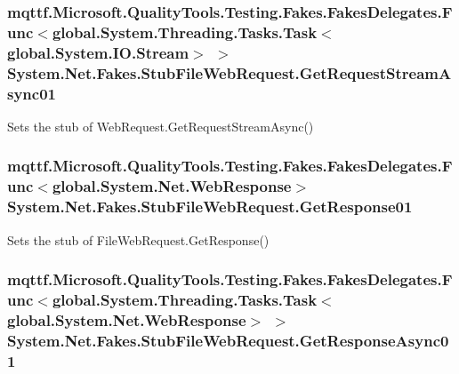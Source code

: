 \hypertarget{class_system_1_1_net_1_1_fakes_1_1_stub_file_web_request_a35c7c5cdf1c0ea35197c3db3ef3066fd}{
\subsubsection[{Get\-Request\-Stream\-Async01}]{\setlength{\rightskip}{0pt plus 5cm}mqttf.\-Microsoft.\-Quality\-Tools.\-Testing.\-Fakes.\-Fakes\-Delegates.\-Func$<$global.\-System.\-Threading.\-Tasks.\-Task$<$global.\-System.\-I\-O.\-Stream$>$ $>$ System.\-Net.\-Fakes.\-Stub\-File\-Web\-Request.\-Get\-Request\-Stream\-Async01}}\label{class_system_1_1_net_1_1_fakes_1_1_stub_file_web_request_a35c7c5cdf1c0ea35197c3db3ef3066fd}


Sets the stub of Web\-Request.\-Get\-Request\-Stream\-Async()

\hypertarget{class_system_1_1_net_1_1_fakes_1_1_stub_file_web_request_a988e69b85c2369d6111cde447ac1ab4d}{
\subsubsection[{Get\-Response01}]{\setlength{\rightskip}{0pt plus 5cm}mqttf.\-Microsoft.\-Quality\-Tools.\-Testing.\-Fakes.\-Fakes\-Delegates.\-Func$<$global.\-System.\-Net.\-Web\-Response$>$ System.\-Net.\-Fakes.\-Stub\-File\-Web\-Request.\-Get\-Response01}}\label{class_system_1_1_net_1_1_fakes_1_1_stub_file_web_request_a988e69b85c2369d6111cde447ac1ab4d}


Sets the stub of File\-Web\-Request.\-Get\-Response()

\hypertarget{class_system_1_1_net_1_1_fakes_1_1_stub_file_web_request_a603ae8c31125fc3831b0323b0dfa95f3}{
\subsubsection[{Get\-Response\-Async01}]{\setlength{\rightskip}{0pt plus 5cm}mqttf.\-Microsoft.\-Quality\-Tools.\-Testing.\-Fakes.\-Fakes\-Delegates.\-Func$<$global.\-System.\-Threading.\-Tasks.\-Task$<$global.\-System.\-Net.\-Web\-Response$>$ $>$ System.\-Net.\-Fakes.\-Stub\-File\-Web\-Request.\-Get\-Response\-Async01}}\label{class_system_1_1_net_1_1_fakes_1_1_stub_file_web_request_a603ae8c31125fc3831b0323b0dfa95f3}


